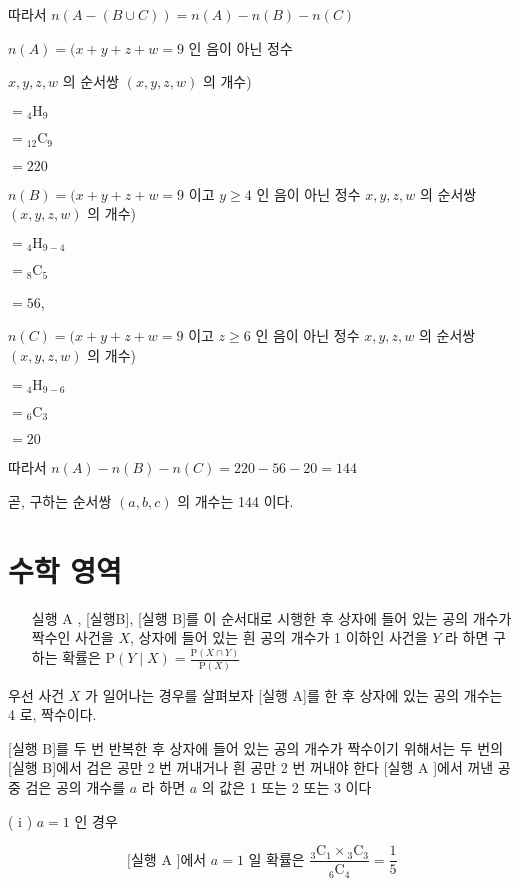 \documentclass[10pt]{article}
\begin{document}
따라서 \(n(A-(B \cup C))=n(A)-n(B)-n(C)\)

\(n(A)=(x+y+z+w=9\) 인 음이 아닌 정수

\(x, y, z, w\) 의 순서쌍 \((x, y, z, w)\) 의 개수)

\(={ }_{4} \mathrm{H}_{9}\)

\(={ }_{12} \mathrm{C}_{9}\)

\(=220\)

\(n(B)=(x+y+z+w=9\) 이고 \(y \geq 4\) 인 음이 아닌 정수 \(x, y, z, w\) 의 순서쌍 \((x, y, z, w)\) 의 개수)

\(={ }_{4} \mathrm{H}_{9-4}\)

\(={ }_{8} \mathrm{C}_{5}\)

\(=56\),

\(n(C)=(x+y+z+w=9\) 이고 \(z \geq 6\) 인 음이 아닌 정수 \(x, y, z, w\) 의 순서쌍 \((x, y, z, w)\) 의 개수)

\(={ }_{4} \mathrm{H}_{9-6}\)

\(={ }_{6} \mathrm{C}_{3}\)

\(=20\)

따라서 \(n(A)-n(B)-n(C)=220-56-20=144\)

곧, 구하는 순서쌍 \((a, b, c)\) 의 개수는 144 이다.

\section*{수학 영역}
\begin{enumerate}
  \setcounter{enumi}{29}
  \item [실행 A], [실행B], [실행 B]를 이 순서대로 시행한 후 상자에 들어 있는 공의 개수가 짝수인 사건을 \(X\), 상자에 들어 있는 흰 공의 개수가 1 이하인 사건을 \(Y\) 라 하면 구하는 확률은 \(\mathrm{P}(Y \mid X)=\frac{\mathrm{P}(X \cap Y)}{\mathrm{P}(X)}\)
\end{enumerate}

우선 사건 \(X\) 가 일어나는 경우를 살펴보자 [실행 A]를 한 후 상자에 있는 공의 개수는 4 로, 짝수이다.

[실행 B]를 두 번 반복한 후 상자에 들어 있는 공의 개수가 짝수이기 위해서는 두 번의 [실행 B]에서 검은 공만 2 번 꺼내거나 흰 공만 2 번 꺼내야 한다 [실행 A ]에서 꺼낸 공 중 검은 공의 개수를 \(a\) 라 하면 \(a\) 의 값은 1 또는 2 또는 3 이다

( i ) \(a=1\) 인 경우

\[
\text { [실행 } \mathrm{A} \text { ]에서 } a=1 \text { 일 확률은 } \frac{{ }_{3} \mathrm{C}_{1} \times{ }_{3} \mathrm{C}_{3}}{{ }_{6} \mathrm{C}_{4}}=\frac{1}{5}
\]
\end{document}
